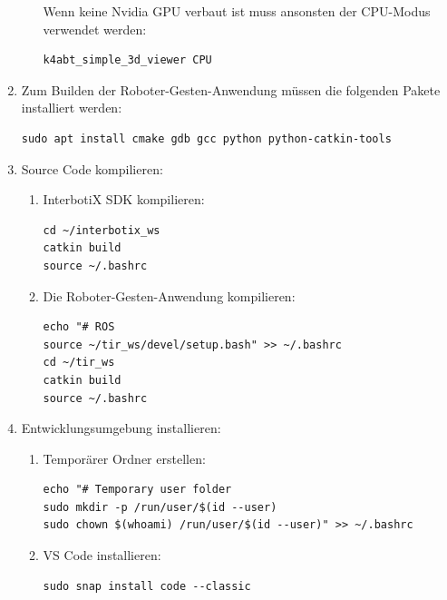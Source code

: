 \begin{enumerate}[label*=\arabic*.]
\begin{enumerate}[label*=\arabic*.]
                Wenn keine Nvidia GPU verbaut ist muss ansonsten der CPU-Modus verwendet werden:
                \begin{lstlisting}[style=bash]
k4abt_simple_3d_viewer CPU
                \end{lstlisting}
        \end{enumerate}

    \item Zum Builden der Roboter-Gesten-Anwendung müssen die folgenden Pakete installiert werden:
        \begin{lstlisting}[style=bash]
sudo apt install cmake gdb gcc python python-catkin-tools
        \end{lstlisting}

    \item Source Code kompilieren:
        \begin{enumerate}[label*=\arabic*.]
            \item InterbotiX SDK kompilieren:
                \begin{lstlisting}[style=bash]
cd ~/interbotix_ws
catkin build
source ~/.bashrc
                \end{lstlisting}

            \item Die Roboter-Gesten-Anwendung kompilieren:
                \begin{lstlisting}[style=bash]
echo "# ROS
source ~/tir_ws/devel/setup.bash" >> ~/.bashrc
cd ~/tir_ws
catkin build
source ~/.bashrc
                \end{lstlisting}
        \end{enumerate}

    \item Entwicklungsumgebung installieren:
        \begin{enumerate}[label*=\arabic*.]
            \item Temporärer Ordner erstellen:
                \begin{lstlisting}[style=bash]
echo "# Temporary user folder
sudo mkdir -p /run/user/$(id --user)
sudo chown $(whoami) /run/user/$(id --user)" >> ~/.bashrc
                \end{lstlisting}

            \item VS Code installieren:
                \begin{lstlisting}[style=bash]
sudo snap install code --classic
                \end{lstlisting}


\end{enumerate}
\end{enumerate}

